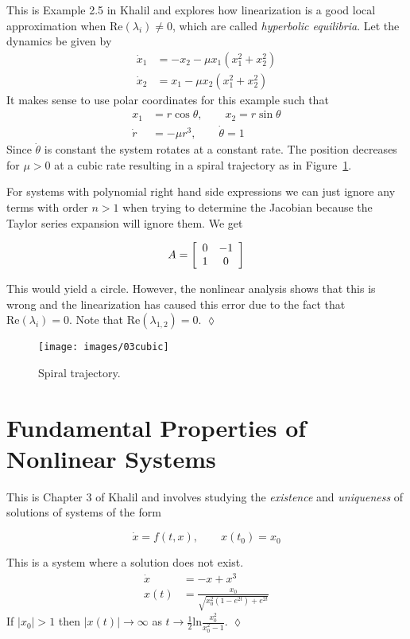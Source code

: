 \begin{example}
This is Example 2.5 in Khalil and explores how linearization is a good local approximation when $\text{Re} (\lambda_i)\neq0$, which are called \textit{hyperbolic equilibria}.
Let the dynamics be given by
\begin{align*}
\dot{x}_1 &= -x_2 - \mu x_1(x_1^2 + x_2^2) \\
\dot{x}_2 &= x_1 - \mu x_2(x_1^2 + x_2^2)
\end{align*}
It makes sense to use polar coordinates for this example such that
\begin{align*}
x_1 &= r\cos\theta, \qquad x_2 = r\sin\theta \\
\dot{r} &= -\mu r^3, \qquad \dot{\theta} = 1
\end{align*}
Since $\dot{\theta}$ is constant the system rotates at a constant rate.
The position decreases for $\mu>0$ at a cubic rate resulting in a spiral trajectory as in Figure~\ref{fig:03cubic}.

For systems with polynomial right hand side expressions we can just ignore any terms with order $n>1$ when trying to determine the Jacobian because the Taylor series expansion will ignore them.
We get

\begin{equation*}
A = \left[\begin{array}{c c} 0 & -1 \\ 1 & 0 \end{array}\right]
\end{equation*}

This would yield a circle.
However, the nonlinear analysis shows that this is wrong and the linearization has caused this error due to the fact that $\text{Re} (\lambda_i) = 0$.
Note that $\text{Re} (\lambda_{1,2}) = 0$.
$\lozenge$
\end{example}

\begin{figure}[ht!]
\centering
\texttt{[image: images/03cubic]}
\caption{Spiral trajectory.}%
\label{fig:03cubic}
\end{figure}

\section{Fundamental Properties of Nonlinear Systems}
This is Chapter 3 of Khalil and involves studying the \textit{existence} and \textit{uniqueness} of solutions of systems of the form

\begin{equation*}
\dot{x} = f (t,x), \qquad x (t_0) = x_0
\end{equation*}

\begin{example}
This is a system where a solution does not exist.
\begin{align*}
\dot{x} &= -x + x^3 \\
x(t) &= \frac{x_0}{\sqrt{x_0^2(1-e^{2t}) + e^{2t}}}
\end{align*}
If $|x_0|>1$ then $|x(t)|\to\infty$ as $t\to\tfrac{1}{2}\text{ln}\frac{x_0^2}{x_0^2-1}$.
$\lozenge$
\end{example}
